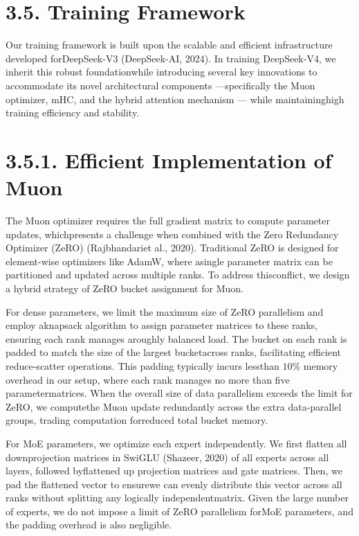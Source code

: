 \documentclass[
  10
]{article}
\begin{document}
\section{3.5. Training Framework}\label{training-framework}

Our training framework is built upon the scalable and efficient
infrastructure developed forDeepSeek-V3 (DeepSeek-AI, 2024). In training
DeepSeek-V4, we inherit this robust foundationwhile introducing several
key innovations to accommodate its novel architectural components
---specifically the Muon optimizer, mHC, and the hybrid attention
mechanism --- while maintaininghigh training efficiency and stability.

\section{3.5.1. Efficient Implementation of
Muon}\label{efficient-implementation-of-muon}

The Muon optimizer requires the full gradient matrix to compute
parameter updates, whichpresents a challenge when combined with the Zero
Redundancy Optimizer (ZeRO) (Rajbhandariet al., 2020). Traditional ZeRO
is designed for element-wise optimizers like AdamW, where asingle
parameter matrix can be partitioned and updated across multiple ranks.
To address thisconflict, we design a hybrid strategy of ZeRO bucket
assignment for Muon.

For dense parameters, we limit the maximum size of ZeRO parallelism and
employ aknapsack algorithm to assign parameter matrices to these ranks,
ensuring each rank manages aroughly balanced load. The bucket on each
rank is padded to match the size of the largest bucketacross ranks,
facilitating efficient reduce-scatter operations. This padding typically
incurs lessthan \(1 0 \%\) memory overhead in our setup, where each rank
manages no more than five parametermatrices. When the overall size of
data parallelism exceeds the limit for ZeRO, we computethe Muon update
redundantly across the extra data-parallel groups, trading computation
forreduced total bucket memory.

For MoE parameters, we optimize each expert independently. We first
flatten all downprojection matrices in SwiGLU (Shazeer, 2020) of all
experts across all layers, followed byflattened up projection matrices
and gate matrices. Then, we pad the flattened vector to ensurewe can
evenly distribute this vector across all ranks without splitting any
logically independentmatrix. Given the large number of experts, we do
not impose a limit of ZeRO parallelism forMoE parameters, and the
padding overhead is also negligible.
\end{document}
